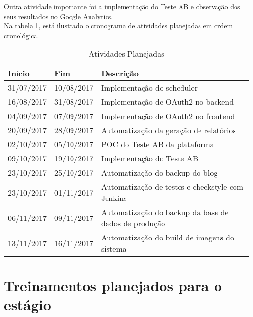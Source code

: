 Outra atividade importante foi a implementação do \gls{Teste AB} e observação dos seus resultados no Google Analytics.\\

Na tabela \ref{tab:tabPlan}, está ilustrado o cronograma de atividades planejadas em ordem cronológica.\\

\begin{table}[H]
\begin{center}
\caption[Atividades Planejadas]
{Atividades Planejadas}\label{tab:tabPlan}

\begin{tabular}{llp{7cm}} \hline

\hline
\textbf{Início}    & \textbf{Fim} &  \textbf{Descrição}                             \\
\hline
31/07/2017        & 10/08/2017      & Implementação do \gls{scheduler}\\
16/08/2017        & 31/08/2017      & Implementação de \gls{OAuth2} no \gls{backend}\\
04/09/2017        & 07/09/2017      & Implementação de \gls{OAuth2} no \gls{frontend}\\
20/09/2017        & 28/09/2017      & Automatização da geração de relatórios\\
02/10/2017        & 05/10/2017      & \gls{POC} do \gls{Teste AB} da plataforma\\
09/10/2017        & 19/10/2017      & Implementação do \gls{Teste AB}\\
23/10/2017        & 25/10/2017      & Automatização do \gls{backup} do blog\\
23/10/2017        & 01/11/2017      & Automatização de testes e \gls{checkstyle} com \gls{Jenkins}\\
06/11/2017        & 09/11/2017      & Automatização do \gls{backup} da base de dados de produção\\
13/11/2017        & 16/11/2017      & Automatização do build de imagens do sistema\\
\hline

\hline
\end{tabular}
\end{center}
\end{table}

\section{Treinamentos planejados para o estágio}

